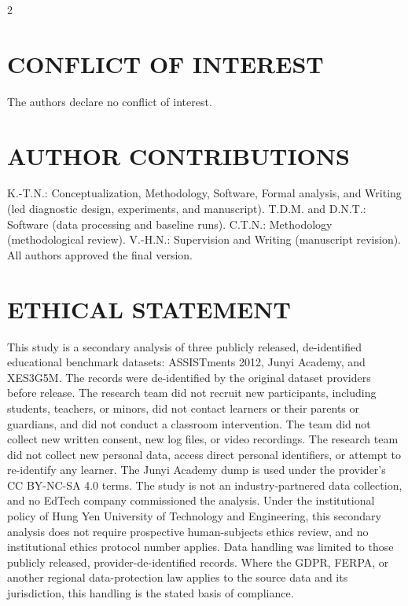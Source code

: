 \documentclass[10pt,a4paper]{article}
\begin{document}
\begin{multicols}{2}


\section*{\MakeUppercase{Conflict of Interest}}

The authors declare no conflict of interest.

\section*{\MakeUppercase{Author Contributions}}

K.-T.N.: Conceptualization, Methodology, Software, Formal analysis, and Writing (led diagnostic design, experiments, and manuscript). T.D.M. and D.N.T.: Software (data processing and baseline runs). C.T.N.: Methodology (methodological review). V.-H.N.: Supervision and Writing (manuscript revision). All authors approved the final version.

\section*{\MakeUppercase{Ethical Statement}}

This study is a secondary analysis of three publicly released, de-identified educational benchmark datasets: ASSISTments 2012, Junyi Academy, and XES3G5M. The records were de-identified by the original dataset providers before release. The research team did not recruit new participants, including students, teachers, or minors, did not contact learners or their parents or guardians, and did not conduct a classroom intervention. The team did not collect new written consent, new log files, or video recordings. The research team did not collect new personal data, access direct personal identifiers, or attempt to re-identify any learner. The Junyi Academy dump is used under the provider's CC BY-NC-SA 4.0 terms. The study is not an industry-partnered data collection, and no EdTech company commissioned the analysis. Under the institutional policy of Hung Yen University of Technology and Engineering, this secondary analysis does not require prospective human-subjects ethics review, and no institutional ethics protocol number applies. Data handling was limited to those publicly released, provider-de-identified records. Where the GDPR, FERPA, or another regional data-protection law applies to the source data and its jurisdiction, this handling is the stated basis of compliance.


\end{multicols}
\end{document}
